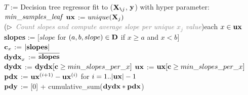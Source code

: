 \documentclass[smallextended]{svjour3}       %
\newcommand{\cut}[1]{}
\newcommand{\Xnj}{${\bf X}_{\texttt{\char`\\} j}$}
\begin{document}
\SetAlgoNoEnd%
\setlength{\algomargin}{5pt}
\begin{algorithm}[H]
\SetAlgoLined
\DontPrintSemicolon
{}
\SetAlgoSkip{}
\small
$T$ := Decision tree regressor fit to (\Xnj{}, $\bf y$) with hyper parameter: ${\it min\_samples\_leaf}$\;
$\bf ux$ := $unique({\bf X}_j)$\\
\For(\hfill$\triangleright$\ {\it\textcolor{gray}{\small Count slopes and compute average slope per unique $x_j$ value}}){each $x \in {\bf ux}$}{
	{\bf slopes} := [$slope$ for $(a,b,slope) \in \bf D$ if $x \ge a$ and $x <b$]\\
	${\bf c}_x$ := $|{\bf slopes}|$\\
	${\bf dydx}_x$ := $\overline{\bf slopes}$\\
}
${\bf dydx}$ := ${\bf dydx}[{\bf c} \ge min\_slopes\_per\_x]$
${\bf ux}$ := ${\bf ux}[{\bf c} \ge min\_slopes\_per\_x]$\\
$\bf pdx$ := ${\bf ux}^{(i+1)} - {\bf ux}^{(i)}$ for $i = 1..|{\bf ux}|-1$\\
$\bf pdy$ := [0] + cumulative\_sum(${\bf dydx} * \bf pdx$)~~~
\label{alg:StratPD}
\end{algorithm}

\cut{
\begin{alltt}
{\fontfamily{cmss}\selectfont\small
{\bf{}CatStratPD}
Fit tree regressor to all but \(x\sb{j}\) with hyper parameter min_slopes_per_x
For each leaf:
    y bar = Group leaf samples by categories of \(x\sb{j}\), computing average y per unique category \(x\sb{j}\)
    Compute unique categories and counts per category
    refcat is randomly chosen category from \(x\sb{j}\)
    For each unique category x in leaf:
        delta[cat,leaf] = Subtract y for refcat from all y bar (refcat delta will be 0)
end
Let Avg[cat] be vector with running sum mapping category to count
work = set of leaf indexes
while more work and something changed and less than max iterations:
    for each leaf in leaves:
        if cat in delta[:,leaf] intersects with Avg:
            j = random category in intersection
            adjust delta[:,leaf] to be relative to j so delta[j,leaf]==0 then add Avg[j] so comparable
            merge into Avg
    work -= all j merged this iteration
}
\end{alltt}
}
\end{document}

